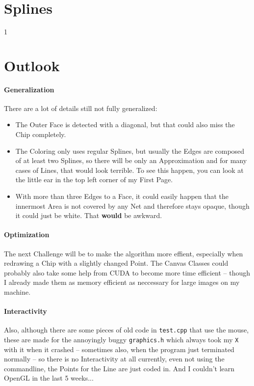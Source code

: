 \documentclass[10pt]{article}
\newcommand\behindIncludes{1}
\begin{document}
\section{Splines}
    
    \if\behindIncludes1
        
    \fi



\section{Outlook}
\paragraph{Generalization}
    There are a lot of details still not fully generalized:
    \begin{itemize}
        \item The Outer Face is detected with a diagonal, but that could also miss the Chip completely.
        \item The Coloring only uses regular Splines, but usually the Edges are composed of at least two Splines, so there will be only an Approximation and for many cases of Lines, that would look terrible. To see this happen, you can look at the little ear in the top left corner of my First Page.
        \item With more than three Edges to a Face, it could easily happen that the innermost Area is not covered by any Net and therefore stays opaque, though it could just be white. That {\bf would} be awkward.
    \end{itemize}
\paragraph{Optimization}
    The next Challenge will be to make the algorithm more effient, especially when redrawing a Chip with a slightly changed Point.
    The Canvas Classes could probably also take some help from CUDA to become more time efficient – though I already made them as memory efficient as neccessary for large images on my machine. \newline
\paragraph{Interactivity}
    Also, although there are some pieces of old code in {\tt test.cpp} that use the mouse, these are made for the annoyingly buggy {\tt graphics.h} which always took my {\tt X} with it when it crashed – sometimes also, when the program just terminated normally – so there is no Interactivity at all currently, even not using the commandline, the Points for the Line are just coded in. And I couldn't learn OpenGL in the last 5 weeks...
\end{document}
